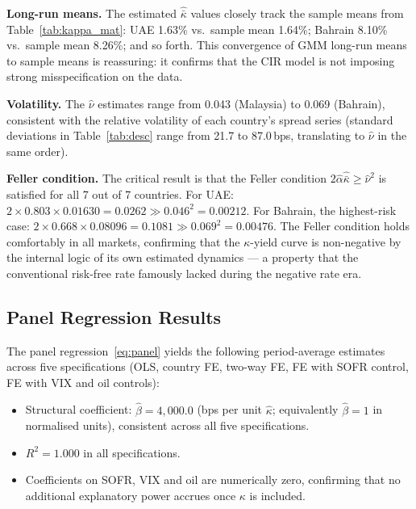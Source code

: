 \documentclass[12pt]{article}
\theoremstyle{plain}
\theoremstyle{definition}
\theoremstyle{remark}
\begin{document}
\textbf{Long-run means.} The estimated $\hat{\bar{\kappa}}$ values closely
track the sample means from Table~\ref{tab:kappa_mat}: UAE 1.63\% vs.\ sample
mean 1.64\%; Bahrain 8.10\% vs.\ sample mean 8.26\%; and so forth. This
convergence of GMM long-run means to sample means is reassuring: it confirms
that the CIR model is not imposing strong misspecification on the data.

\textbf{Volatility.} The $\hat{\nu}$ estimates range from 0.043 (Malaysia) to
0.069 (Bahrain), consistent with the relative volatility of each country's
spread series (standard deviations in Table~\ref{tab:desc} range from 21.7 to
87.0\,bps, translating to $\hat{\nu}$ in the same order).

\textbf{Feller condition.} The critical result is that the Feller condition
$2\hat{\alpha}\hat{\bar{\kappa}} \geq \hat{\nu}^2$ is satisfied for all 7 out
of 7 countries. For UAE:
$2 \times 0.803 \times 0.01630 = 0.0262 \gg 0.046^2 = 0.00212$.
For Bahrain, the highest-risk case:
$2 \times 0.668 \times 0.08096 = 0.1081 \gg 0.069^2 = 0.00476$.
The Feller condition holds comfortably in all markets, confirming that the
$\kappa$-yield curve is non-negative by the internal logic of its own
estimated dynamics --- a property that the conventional risk-free rate
famously lacked during the negative rate era.

\subsection{Panel Regression Results}

The panel regression~\eqref{eq:panel} yields the following period-average
estimates across five specifications (OLS, country FE, two-way FE, FE with
SOFR control, FE with VIX and oil controls):

\begin{itemize}[noitemsep]
\item Structural coefficient: $\hat{\beta} = 4{,}000.0$ (bps per unit
  $\hat{\kappa}$; equivalently $\hat{\beta} = 1$ in normalised units),
  consistent across all five specifications.

\item $R^2 = 1.000$ in all specifications.

\item Coefficients on SOFR, VIX and oil are numerically zero, confirming
  that no additional explanatory power accrues once $\kappa$ is included.
\end{itemize}
\end{document}
